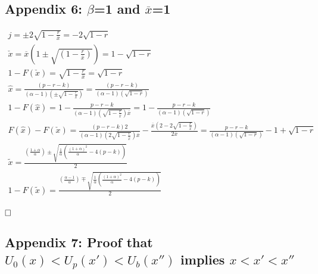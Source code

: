 \documentclass{article}
\begin{document}
\subsection{Appendix 6: $\beta$=1 and $\overline{x}$=1}
\[
\begin{array}{ll}


j = \pm 2 \sqrt{1-\frac{r}{\overline{x}}} 

= - 2 \sqrt{1-r} \\

\check{x}= \overline{x}(1 \pm \sqrt{(1-\frac{r}{\overline{x}})} )

= 1 - \sqrt{1-r}   \\

1 - F(\check{x}) =  \sqrt{1-\frac{r}{\overline{x}}} 

= \sqrt{1-r} \\

\hat{x}=  \frac{(p-r-k) }{(\alpha - 1) (\pm \sqrt{1-\frac{r}{\overline{x}}} )}

=  \frac{(p-r-k) }{(\alpha - 1) ( \sqrt{1-r} )} \\

1 - F(\hat{x}) 

= 1 - \frac{p-r-k}{(\alpha - 1) ( \sqrt{1-\frac{r}{\overline{x}}}) \overline{x} } 

= 1 - \frac{p-r-k}{(\alpha - 1) ( \sqrt{1-r})  }\\

F(\hat{x}) - F(\check{x})
= \frac{(p-r-k)2 }{(\alpha - 1) (  2 \sqrt{1-\frac{r}{\overline{x}}}) \overline{x}} - \frac{\overline{x}(2 - 2 \sqrt{1-\frac{r}{\overline{x}}})}{2  \overline{x}}
= \frac{p-r-k}{(\alpha - 1) (  \sqrt{1-r}) } - 1 +  \sqrt{1-r}\\

\tilde{x} = \frac{(\frac{1+\alpha}{\alpha}) \pm \sqrt{\frac{1}{\alpha}\left(\frac{(1+\alpha)^2}{\alpha}-4(p-k)\right)}} {2} \\

1-F(\tilde{x}) = \frac{(\frac{\alpha-1}{\alpha}) \mp \sqrt{\frac{1}{\alpha}(\frac{(1+\alpha)^2}{\alpha}-4(p-k))}} {2 } \\

\end{array}
\]

$\hfill \square$

\subsection{Appendix 7: Proof that $U_0(x)<U_p(x')<U_b(x'')$ implies $x<x'<x''$ } 
\end{document}
